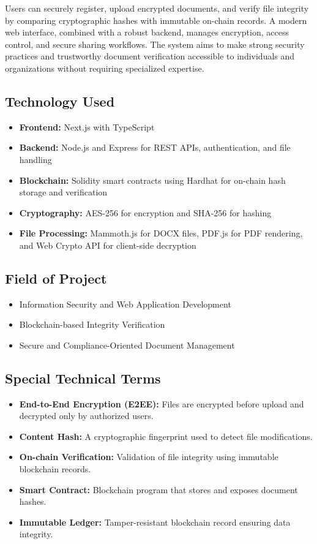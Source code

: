 \documentclass[12pt]{article}
\begin{document}
Users can securely register, upload encrypted documents, and verify file integrity by comparing cryptographic hashes with immutable on-chain records. A modern web interface, combined with a robust backend, manages encryption, access control, and secure sharing workflows. The system aims to make strong security practices and trustworthy document verification accessible to individuals and organizations without requiring specialized expertise.

\subsection{Technology Used}

\begin{itemize}
\item \textbf{Frontend:} Next.js with TypeScript
\item \textbf{Backend:} Node.js and Express for REST APIs, authentication, and file handling
\item \textbf{Blockchain:} Solidity smart contracts using Hardhat for on-chain hash storage and verification
\item \textbf{Cryptography:} AES-256 for encryption and SHA-256 for hashing \cite{nist197}
\item \textbf{File Processing:} Mammoth.js for DOCX files, PDF.js for PDF rendering, and Web Crypto API for client-side decryption
\end{itemize}

\subsection{Field of Project}

\begin{itemize}
\item Information Security and Web Application Development
\item Blockchain-based Integrity Verification
\item Secure and Compliance-Oriented Document Management
\end{itemize}

\subsection{Special Technical Terms}

\begin{itemize}
\item \textbf{End-to-End Encryption (E2EE):} Files are encrypted before upload and decrypted only by authorized users.
\item \textbf{Content Hash:} A cryptographic fingerprint used to detect file modifications.
\item \textbf{On-chain Verification:} Validation of file integrity using immutable blockchain records.
\item \textbf{Smart Contract:} Blockchain program that stores and exposes document hashes.
\item \textbf{Immutable Ledger:} Tamper-resistant blockchain record ensuring data integrity.
\end{itemize}
\end{document}
